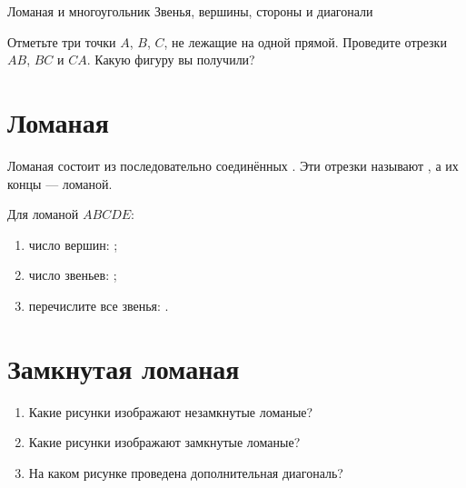 
\worksheettitle
  {Ломаная и многоугольник}
  {Звенья, вершины, стороны и диагонали}

\studentnameblock

\begin{checkpointbox}
  Отметьте три точки \(A\), \(B\), \(C\), не лежащие на одной прямой.
  Проведите отрезки \(AB\), \(BC\) и \(CA\). Какую фигуру вы получили?
  \answerblank[55mm]
\end{checkpointbox}

\section{Ломаная}

\openbrokenfigure

\begin{fillbox}
  Ломаная состоит из последовательно соединённых
  \answerblank[34mm]. Эти отрезки называют \answerblank[28mm], а их
  концы --- \answerblank[32mm] ломаной.
\end{fillbox}

\begin{practicebox}
  Для ломаной \(ABCDE\):
  \begin{enumerate}[label=\alph*),itemsep=0.5em]
    \item число вершин: \answerblank[18mm];
    \item число звеньев: \answerblank[18mm];
    \item перечислите все звенья: \answerblank[90mm].
  \end{enumerate}
\end{practicebox}

\section{Замкнутая ломаная}

\studentrecognizefigure

\begin{practicebox}
  \begin{enumerate}[label=\alph*),itemsep=0.55em]
    \item Какие рисунки изображают незамкнутые ломаные?
      \answerblank[45mm]
    \item Какие рисунки изображают замкнутые ломаные?
      \answerblank[45mm]
    \item На каком рисунке проведена дополнительная диагональ?
      \answerblank[20mm]
  \end{enumerate}
\end{practicebox}

